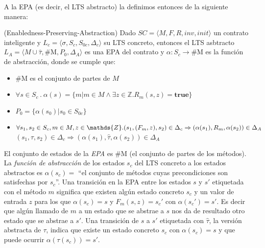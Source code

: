 A la EPA (es decir, el LTS abstracto) la definimos entonces de la siguiente manera:

\begin{definition}\label{definicion-epa}(Enabledness-Preserving-Abstraction) Dado $SC = \langle M, F, R, inv, init \rangle$ un contrato inteligente y $L_c = \langle \sigma , S_c, S_{0c}, \Delta _c \rangle$ su LTS concreto, entonces el LTS asbtracto $L_A = \langle M \cup \hat{\tau} , \text{\#M}, P_0, \Delta _A \rangle$ es una EPA del contrato y $\alpha : S_c \rightarrow \text{\#M}$ es la función de abstracción, donde se cumple que:
    \begin{itemize}
        \item $\text{\#M}$ es el conjunto de partes de $M$
        \item $\forall s \in S_c \: . \:
                  \alpha(s) = \{m | m \in M \land \exists z \in \mathds{Z} . R_m(s,z) = \textbf{true}\}$
        \item $P_0 = \{\alpha(s_0) | s_0 \in S_{0c} \}$
        \item $\forall s_1,s_2 \in S_c, m \in M, z \in \mathds{Z} . \\ (s_1,(F_m,z),s_2) \in \Delta _c \Rightarrow (\alpha(s_1),R_m,\alpha(s_2)) \in \Delta _A$ \\
              $(s_1,\tau,s_2) \in \Delta _c \Rightarrow (\alpha(s_1),\hat{\tau},\alpha(s_2)) \in \Delta _A$
    \end{itemize}
\end{definition}

El conjunto de estados de la \textit{EPA} es $\text{\#M}$ (el conjunto de partes de los métodos).
La \textit{función de abstracción} de los estados $s_c$ del LTS concreto a los estados abstractos es $\alpha (s_c) = $ ``el conjunto de métodos cuyas precondiciones son satisfechas por $s_c$''.
Una transición en la EPA entre los estados $s$ y $s'$ etiquetada con el método $m$ significa que existen algún estado concreto $s_c$ y un valor de entrada $z$ para los que $\alpha(s_c) = s$ y  $F_m(s,z)=s_c'$ con $\alpha(s_c') = s'$.
Es decir que algún llamado de $m$ a un estado que se abstrae a $s$ nos da de resultado otro estado que se abstrae a $s'$.
Una transición de $s$ a $s'$ etiquetada  con $\hat{\tau}$, la versión abstracta de $\tau$, indica que existe un estado concreto $s_c$ con $\alpha(s_c) = s$ y que puede ocurrir $\alpha (\tau (s_c)) = s'$.
